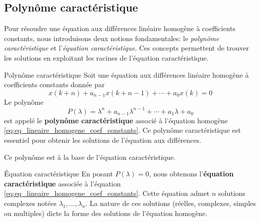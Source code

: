     
        \subsection{Polynôme caractéristique}
            Pour résoudre une équation aux différences linéaire homogène à coefficients constants, nous introduisons deux notions fondamentales: le \textit{polynôme caractéristique} et l'\textit{équation caractéristique}. Ces concepts permettent de trouver les solutions en exploitant les racines de l'équation caractéristique.

            \begin{definition}{Polynôme caractéristique}
                Soit une équation aux différences linéaire homogène à coefficients constants donnée par
                \begin{equation}\label{eq:eq_lineaire_homogene_coef_constants}
                x(k+n)+a_{n-1} x(k+n-1)+\cdots+a_0 x(k) = 0
                \end{equation}
                Le polynôme
                \begin{equation}
                P(\lambda) = \lambda^n+a_{n-1} \lambda^{n-1}+\cdots+a_1 \lambda+a_0
                \end{equation}
                est appelé le \textbf{polynôme caractéristique} associé à l'équation homogène \eqref{eq:eq_lineaire_homogene_coef_constants}. Ce polynôme caractéristique est essentiel pour obtenir les solutions de l'équation aux différences.
            \end{definition}
            Ce polynôme est à la base de l'équation caractéristique.
            \begin{definition}{Équation caractéristique}
                En posant $P(\lambda) = 0$, nous obtenons l'\textbf{équation caractéristique} associée à l'équation \eqref{eq:eq_lineaire_homogene_coef_constants}. Cette équation admet $n$ solutions complexes notées $\lambda_1, \dots, \lambda_n$. La nature de ces solutions (réelles, complexes, simples ou multiples) dicte la forme des solutions de l'équation homogène.
            \end{definition}

